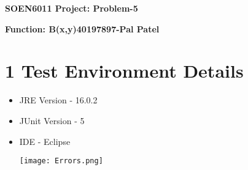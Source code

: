 \documentclass{report}
\begin{document}
\begin{center}\Large\textbf{SOEN6011 Project: Problem-5}\end{center}
\begin{center}\author{Pal Patel}\end{center}

\begin{flushleft}\Large\textbf{Function: B(x,y)}\hfill\textbf{40197897-Pal Patel}\end{flushleft}

\section* {1 Test Environment Details}
\begin{itemize}
    \item JRE Version - 16.0.2
    \item JUnit Version - 5
    \item IDE - Eclipse
\begin{center}
   \texttt{[image: Errors.png]}
\end{center}
\end{itemize}
\end{document}
